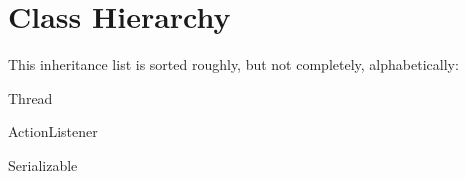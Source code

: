 \section{Class Hierarchy}
This inheritance list is sorted roughly, but not completely, alphabetically\+:\begin{DoxyCompactList}
\item {}
\item {}
\item {}
\item {}
\item Thread\begin{DoxyCompactList}
\item {}
\end{DoxyCompactList}
\item Action\+Listener\begin{DoxyCompactList}
\item {}
\end{DoxyCompactList}
\item Serializable\begin{DoxyCompactList}
\item {}
\end{DoxyCompactList}
\end{DoxyCompactList}
